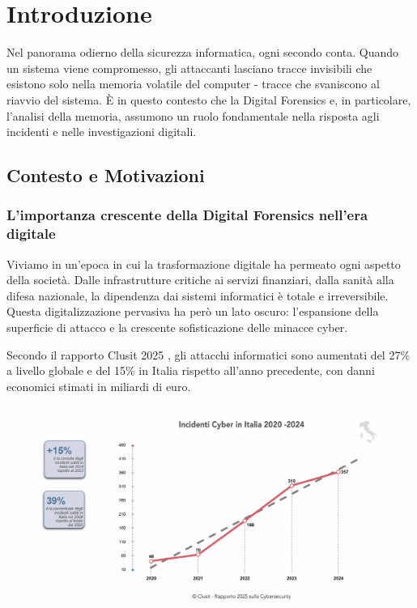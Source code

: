 \chapter{Introduzione}

Nel panorama odierno della sicurezza informatica, ogni secondo conta. Quando un sistema viene compromesso, gli attaccanti lasciano tracce invisibili che esistono solo nella memoria volatile del computer - tracce che svaniscono al riavvio del sistema. È in questo contesto che la Digital Forensics e, in particolare, l'analisi della memoria, assumono un ruolo fondamentale nella risposta agli incidenti e nelle investigazioni digitali.

\section{Contesto e Motivazioni}

\subsection{L'importanza crescente della Digital Forensics nell'era digitale}

Viviamo in un'epoca in cui la trasformazione digitale ha permeato ogni aspetto della società. Dalle infrastrutture critiche ai servizi finanziari, dalla sanità alla difesa nazionale, la dipendenza dai sistemi informatici è totale e irreversibile. Questa digitalizzazione pervasiva ha però un lato oscuro: l'espansione della superficie di attacco e la crescente sofisticazione delle minacce cyber.

Secondo il rapporto Clusit 2025 \cite{clusit2025}, gli attacchi informatici sono aumentati del 27\% a livello globale e del 15\% in Italia rispetto all'anno precedente, con danni economici stimati in miliardi di euro.

\begin{figure}[ht]
    \centering
    \includegraphics[width=1\linewidth]{images/intro/clusit-ita.png}
\end{figure}

